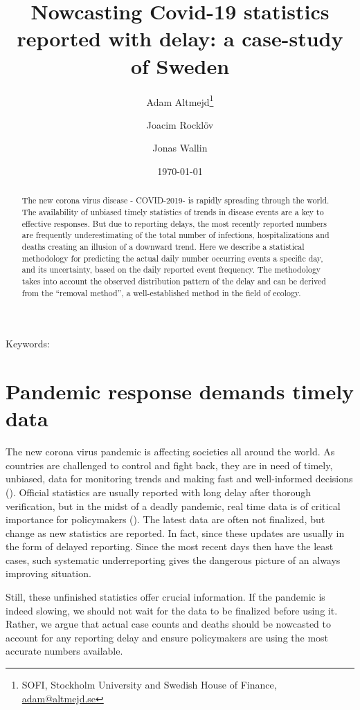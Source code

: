 \documentclass[a4paper,11pt,article,oneside,openany,american]{memoir}
\title{Nowcasting Covid-19 statistics reported with delay: a case-study of Sweden}
\date{\today}
\author{
	Adam Altmejd\thanks{SOFI, Stockholm University and Swedish House of Finance, \href{mailto:adam@altmejd.se}{adam@altmejd.se}} \and
	Joacim Rocklöv \and
	Jonas Wallin
}
\begin{document}
\frontmatter%
\begin{titlingpage}
    \maketitle
    \begin{abstract}
        The new corona virus disease - COVID-2019- is rapidly spreading through the world. The availability of unbiased timely statistics of trends in disease events are a key to effective responses. But due to reporting delays, the most recently reported numbers are frequently underestimating of the total number of infections, hospitalizations and deaths creating an illusion of a downward trend. Here we describe a statistical methodology for predicting the actual daily number occurring events a specific day, and its uncertainty, based on the daily reported event frequency. The methodology takes into account the observed distribution pattern of the delay and can be derived from the “removal method”, a well-established method in the field of ecology.
	\end{abstract}

	\noindent Keywords:

\end{titlingpage}
\mainmatter%

\chapter{Pandemic response demands timely data}
The new corona virus pandemic is affecting societies all around the world. As countries are challenged to control and fight back, they are in need of timely, unbiased, data for monitoring trends and making fast and well-informed decisions (\cite{No_author_2020_coronavirus_three}). Official statistics are usually reported with long delay after thorough verification, but in the midst of a deadly pandemic, real time data is of critical importance for policymakers (\cite{Jajosky2004_evaluation_reporting}). The latest data are often not finalized, but change as new statistics are reported. In fact, since these updates are usually in the form of delayed reporting. Since the most recent days then have the least cases, such systematic underreporting gives the dangerous picture of an always improving situation.

Still, these unfinished statistics offer crucial information. If the pandemic is indeed slowing, we should not wait for the data to be finalized before using it. Rather, we argue that actual case counts and deaths should be nowcasted to account for any reporting delay and ensure policymakers are using the most accurate numbers available.
\end{document}
